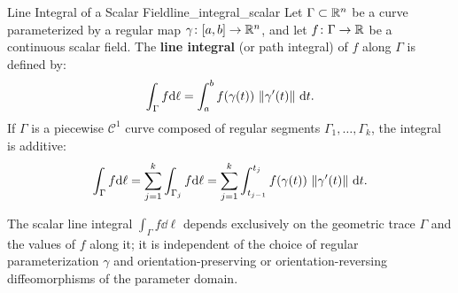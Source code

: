 \begin{definition}{Line Integral of a Scalar Field}{line_integral_scalar}
Let $\Gamma \subset \mathbb{R}^n$ be a curve parameterized by a regular map $\gamma \colon [a, b] \to \mathbb{R}^n$, and let $f \colon \Gamma \to \mathbb{R}$ be a continuous scalar field. The \textbf{line integral} (or path integral) of $f$ along $\Gamma$ is defined by:
\begin{equation}
    \int_{\Gamma} f \mathrm{d}\ell = \int_a^b f(\gamma(t)) \, \left\lVert\gamma'(t)\right\rVert \,\mathrm{d}t.
\end{equation}
If $\Gamma$ is a piecewise $\mathcal{C}^1$ curve composed of regular segments $\Gamma_1, \dots, \Gamma_k$, the integral is additive:
\begin{equation}
    \int_{\Gamma} f \mathrm{d}\ell = \sum_{j=1}^k \int_{\Gamma_j} f \mathrm{d}\ell = \sum_{j=1}^k \int_{t_{j-1}}^{t_j} f(\gamma(t)) \, \left\lVert\gamma'(t)\right\rVert \,\mathrm{d}t.
\end{equation}
\end{definition}

\begin{remarque}
The scalar line integral $\int_{\Gamma} f \dd\ell$ depends exclusively on the geometric trace $\Gamma$ and the values of $f$ along it; it is independent of the choice of regular parameterization $\gamma$ and orientation-preserving or orientation-reversing diffeomorphisms of the parameter domain.
\end{remarque}